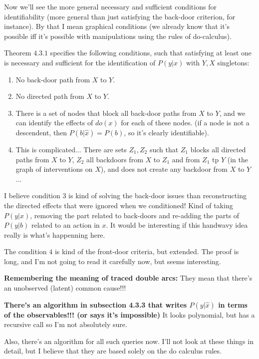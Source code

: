 Now we'll see the more general necessary and sufficient conditions for identifiability (more general than just satisfying the back-door criterion, for instance). By that I mean graphical conditions (we already know that it's possible iff it's possible with manipulations using the rules of do-calculus).

Theorem $4.3.1$ specifies the following conditions, such that satisfying at least one is necessary and sufficient for the identification of $P(y|x)$ with $Y,X$ singletons:

\begin{enumerate}
\item No back-door path from $X$ to $Y$.
\item No directed path from $X$ to $Y$.
\item There is a set of nodes that block all back-door paths from $X$ to $Y$, and we can identify the effects of $do(x)$ for each of these nodes. (if a node is not a descendent, then $P(b|\hat{x}) = P(b)$, so it's clearly identifiable).
\item This is complicated... There are sets $Z_1,Z_2$ such that $Z_1$ blocks all directed paths from $X$ to $Y$, $Z_2$ all backdoors from $X$ to $Z_1$ and from $Z_1$ tp $Y$ (in the graph of interventions on $X$), and does not create any backdoor from $X$ to $Y$...
\end{enumerate}

I believe condition $3$ is kind of solving the back-door issues than reconstructing the directed effects that were ignored when we conditioned! Kind of taking $P(y|x)$, removing the part related to back-doors and re-adding the parts of $P(y|b)$ related to an action in $x$. It would be interesting if this handwavy idea really is what's happenning here.

The condition $4$ is kind of the front-door criteria, but extended. The proof is long, and I'm not going to read it carefully now, but seems interesting.

\textbf{Remembering the meaning of traced double arcs: } They mean that there's an unobserved (latent) common cause!!!


\textbf{There's an algorithm in subsection 4.3.3 that writes $P(y|\hat{x})$ in terms of the observables!!! (or says it's impossible)} It looks polynomial, but has a recursive call so I'm not absolutely sure.

Also, there's an algorithm for all such queries now. I'll not look at these things in detail, but I believe that they are based solely on the do calculus rules.
